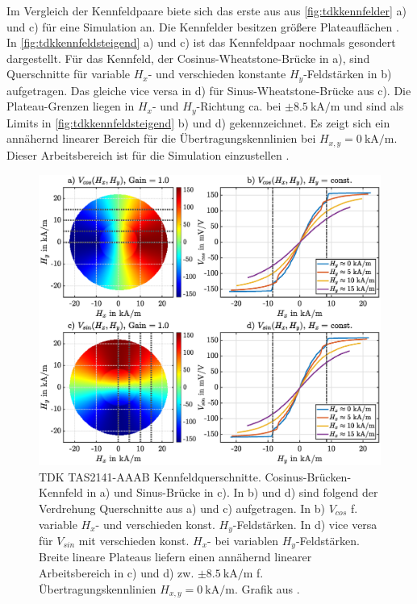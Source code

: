 \clearpage


Im Vergleich der Kennfeldpaare biete sich das erste aus aus \autoref{fig:tdkkennfelder} a) und c) für eine Simulation 
an. Die Kennfelder besitzen größere Plateauflächen \cite{Schuethe2019}. In \autoref{fig:tdkkennfeldsteigend} a) und c) 
ist das Kennfeldpaar nochmals gesondert dargestellt. Für das Kennfeld, der Cosinus-Wheatstone-Brücke in a), sind 
Querschnitte für variable $H_x$- und verschieden konstante $H_y$-Feldstärken in b) aufgetragen. Das gleiche vice versa 
in d) für Sinus-Wheatstone-Brücke aus c). Die Plateau-Grenzen liegen in $H_x$- und $H_y$-Richtung ca. bei 
$\pm\SI{8,5}{\kilo\ampere\per\metre}$ und sind als Limits in \autoref{fig:tdkkennfeldsteigend} b) und d) 
gekennzeichnet. Es zeigt sich ein annähernd linearer Bereich für die Übertragungskennlinien bei $H_{x,y} 
= \SI{0}{\kilo\ampere\per\metre}$. Dieser Arbeitsbereich ist für die Simulation einzustellen \cite{Schuethe2019}.


\vspace{5mm}
\begin{figure}[bph]
	\centering
	\includegraphics[width=.95\linewidth]{appendix/images/3-TDK/TDK_Kennfeld_Steigend}
	\caption[TDK TAS2141-AAAB Kennfeldquerschnitte]{TDK TAS2141-AAAB Kennfeldquerschnitte. Cosinus-Brücken-Kennfeld in 
	a) und Sinus-Brücke in c). In b) und d) sind folgend der Verdrehung Querschnitte aus a) und c) aufgetragen. In b) 
	$V_{cos}$ f. variable $H_x$- und verschieden konst. $H_y$-Feldstärken. In d) vice versa für $V_{sin}$ mit 
	verschieden konst. $H_x$- bei variablen $H_y$-Feldstärken. Breite lineare Plateaus liefern einen annähernd linearer 
	Arbeitsbereich in c) und d) zw. $\pm\SI{8,5}{\kilo\ampere\per\metre}$ f. Übertragungskennlinien $H_{x,y} = 
	\SI{0}{\kilo\ampere\per\metre}$. Grafik aus \cite{Schuethe2019}.}
	\label{fig:tdkkennfeldsteigend}
\end{figure}
